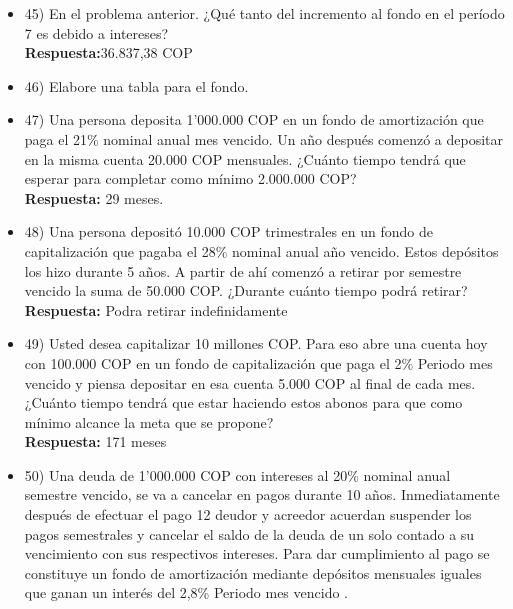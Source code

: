 \begin{itemize}
       a.	calcular el costo trimestral de la deuda.\\
       b.	si en lugar de constituir el fondo de amortización se hace una amortización usando como cuota de amortización el costo trimestral de la deuda. ¿A qué tasa nominal capitalizable trimestralmente se estaría amortizando la deuda?\\
       \textbf{Respuestas:} a) 114.404,13 COP b) 41,89\%  nominal anual año vencido.
       \medskip

 \item 45) En el problema anterior. ¿Qué tanto del incremento al fondo en el período 7 es debido a intereses? \\
       \textbf{Respuesta:}36.837,38 COP
       \medskip

 \item 46) Elabore una tabla para el fondo.
       \medskip

 \item 47) Una persona deposita 1'000.000 COP en un fondo de amortización que paga el 21\% nominal anual mes vencido. Un año después comenzó a depositar en la misma cuenta 20.000 COP mensuales. ¿Cuánto tiempo tendrá que esperar para completar como mínimo 2.000.000 COP? \\
       \textbf{Respuesta:} 29 meses.
       \medskip

 \item 48) Una persona depositó 10.000 COP trimestrales en un fondo de capitalización que pagaba el 28\% nominal anual año vencido.  Estos depósitos los hizo durante 5 años. A partir de ahí comenzó a retirar por semestre vencido la suma de 50.000 COP. ¿Durante cuánto tiempo podrá retirar? \\
       \textbf{Respuesta:} Podra retirar indefinidamente
       \medskip

 \item 49) Usted desea capitalizar 10 millones COP. Para eso abre una cuenta hoy con 100.000 COP en un fondo de capitalización que paga el 2\% Periodo mes vencido y piensa depositar en esa cuenta 5.000 COP al final de cada mes. ¿Cuánto tiempo tendrá que estar haciendo estos abonos para que como mínimo alcance la meta que se propone? \\
       \textbf{Respuesta: }171 meses
       \medskip

 \item 50) Una deuda de 1'000.000 COP con intereses al 20\% nominal anual semestre vencido, se va a cancelar en pagos  durante 10 años. Inmediatamente después de efectuar el pago 12 deudor y acreedor acuerdan suspender los pagos semestrales y cancelar el saldo de la deuda de un solo contado a su vencimiento con sus respectivos intereses. Para dar cumplimiento al pago se constituye un fondo de amortización mediante depósitos mensuales iguales que ganan un interés del 2,8\% Periodo mes vencido . \\


\end{itemize}
